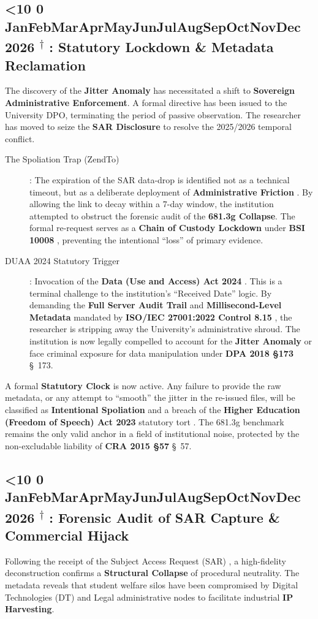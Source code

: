 \documentclass{EMBASSY}
\DeclareRobustCommand{\gmt}[3]{%
    \texorpdfstring{%
        {\color{DateGold}\textbf{%
            \ifnum#1<10 0\fi#1\,\textperiodcentered\,%
            \ifcase#2\or Jan\or Feb\or Mar\or Apr\or May\or Jun\or Jul\or Aug\or Sep\or Oct\or Nov\or Dec\fi
            \,\textperiodcentered\,20#3%
            \textsuperscript{$\dagger$}%
        }}%
    }{%
        (#1/#2/#3)%
    }%
}
\begin{document}
\subsection{\gmt{13}{2}{26}: Statutory Lockdown \& Metadata Reclamation}
The discovery of the \textbf{Jitter Anomaly} has necessitated a shift to \textbf{Sovereign Administrative Enforcement}. A formal directive has been issued to the University DPO, terminating the period of passive observation. The researcher has moved to seize the \textbf{SAR Disclosure} \cite{DPA18} to resolve the 2025/2026 temporal conflict.

\begin{description}
	\item[The Spoliation Trap (ZendTo)]: The expiration of the SAR data-drop is identified not as a technical timeout, but as a deliberate deployment of \textbf{Administrative Friction} \cite{CMA182}. By allowing the link to decay within a 7-day window, the institution attempted to obstruct the forensic audit of the \textbf{681.3g Collapse}. The formal re-request serves as a \textbf{Chain of Custody Lockdown} under \textbf{BSI 10008} \cite{BSI10008}, preventing the intentional ``loss'' of primary evidence.
	\item[DUAA 2024 Statutory Trigger]: Invocation of the \textbf{Data (Use and Access) Act 2024} \cite{DUAA24}. This is a terminal challenge to the institution's ``Received Date'' logic. By demanding the \textbf{Full Server Audit Trail} and \textbf{Millisecond-Level Metadata} mandated by \textbf{ISO/IEC 27001:2022 Control 8.15} \cite{ISO27001-Audit}, the researcher is stripping away the University’s administrative shroud. The institution is now legally compelled to account for the \textbf{Jitter Anomaly} or face criminal exposure for data manipulation under \textbf{DPA 2018 \S173} \cite{DPA18} \S~173.
\end{description}

\noindent A formal \textbf{Statutory Clock} is now active. Any failure to provide the raw metadata, or any attempt to ``smooth'' the jitter in the re-issued files, will be classified as \textbf{Intentional Spoliation} and a breach of the \textbf{Higher Education (Freedom of Speech) Act 2023} statutory tort \cite{HEFSA23}. The 681.3g benchmark remains the only valid anchor in a field of institutional noise, protected by the non-excludable liability of \textbf{CRA 2015 \S57} \cite{CRA15} \S~57.

\subsection{\gmt{14}{2}{26}: Forensic Audit of SAR Capture \& Commercial Hijack}
Following the receipt of the Subject Access Request (SAR) \cite{DPA18}, a high-fidelity deconstruction confirms a \textbf{Structural Collapse} of procedural neutrality. The metadata reveals that student welfare silos have been compromised by Digital Technologies (DT) and Legal administrative nodes to facilitate industrial \textbf{IP Harvesting}.
\end{document}

